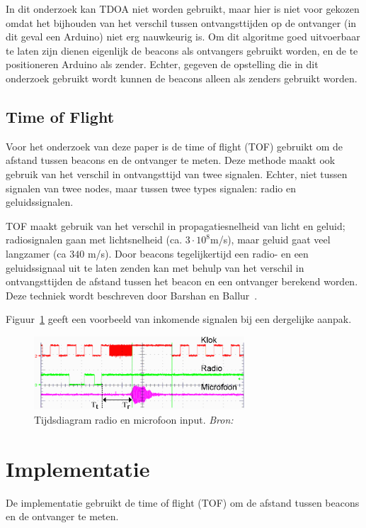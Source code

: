 \documentclass[a4paper,10pt]{article}
\begin{document}
In dit onderzoek kan TDOA niet worden gebruikt, maar hier is niet voor gekozen omdat het bijhouden van het verschil tussen ontvangsttijden op de ontvanger (in dit geval een Arduino) niet erg nauwkeurig is. Om dit algoritme goed uitvoerbaar te laten zijn dienen eigenlijk de beacons als ontvangers gebruikt worden, en de te positioneren Arduino als zender. Echter, gegeven de opstelling die in dit onderzoek gebruikt wordt kunnen de beacons alleen als zenders gebruikt worden.

\subsection{Time of Flight}\label{sec:tof}
Voor het onderzoek van deze paper is de time of flight (TOF) gebruikt om de afstand tussen beacons en de ontvanger te meten. Deze methode maakt ook gebruik van het verschil in ontvangsttijd van twee signalen. Echter, niet tussen signalen van twee nodes, maar tussen twee types signalen: radio en geluidssignalen.

TOF maakt gebruik van het verschil in propagatiesnelheid van licht en geluid; radiosignalen gaan met lichtsnelheid (ca. $3\cdot 10^{8}$m/s), maar geluid gaat veel langzamer (ca $340$ m/s). Door beacons tegelijkertijd een radio- en een geluidssignaal uit te laten zenden kan met behulp van het verschil in ontvangsttijden de afstand tussen het beacon en een ontvanger berekend worden. Deze techniek wordt beschreven door Barshan en Ballur~\cite{barshan2000fast}.

Figuur~\ref{fig:tijdsdiagram} geeft een voorbeeld van inkomende signalen bij een dergelijke aanpak.
\begin{figure}[ht!]
    \centering
    \includegraphics[width=0.7\textwidth]{tijdsdiagram.png}
    \caption{Tijdsdiagram radio en microfoon input. \textit{Bron: \cite{park2011beacon}}}
    \label{fig:tijdsdiagram}
\end{figure}

\section{Implementatie}\label{sec:implementatie}
De implementatie gebruikt de time of flight (TOF) om de afstand tussen beacons en de ontvanger te meten.
\end{document}

